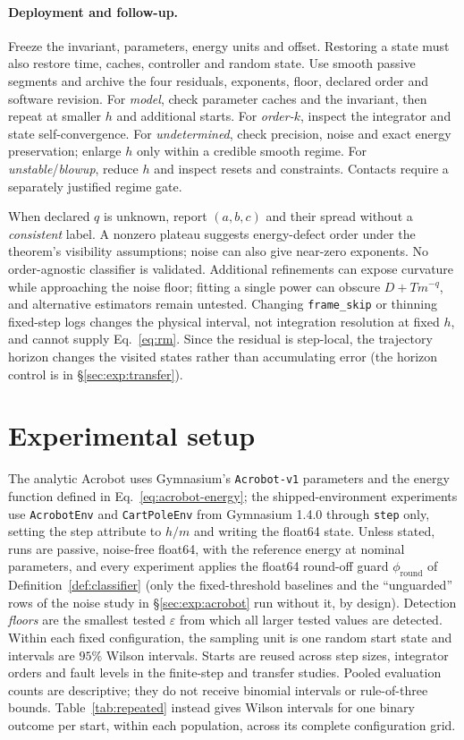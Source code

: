 \documentclass[10pt]{article}
\theoremstyle{definition}
\begin{document}
\paragraph{Deployment and follow-up.}\label{sec:deployment}
Freeze the invariant, parameters, energy units and offset. Restoring a state
must also restore time, caches, controller and random state. Use smooth passive
segments and archive the four residuals, exponents, floor, declared order and
software revision. For \emph{model}, check parameter caches and the invariant,
then repeat at smaller $h$ and additional starts. For \emph{order-$k$}, inspect
the integrator and state self-convergence. For \emph{undetermined}, check
precision, noise and exact energy preservation; enlarge $h$ only within a
credible smooth regime. For \emph{unstable}/\emph{blowup}, reduce $h$ and inspect
resets and constraints. Contacts require a separately justified regime gate.

When declared $q$ is unknown, report $(a,b,c)$ and their spread without a
\emph{consistent} label. A nonzero plateau suggests energy-defect order under
the theorem's visibility assumptions; noise can also give near-zero exponents.
No order-agnostic classifier is validated. Additional refinements can expose
curvature while approaching the noise floor; fitting a single power can
obscure $D+Tm^{-q}$, and alternative estimators remain untested. Changing
\texttt{frame\_skip} or thinning fixed-step logs changes the physical
interval, not integration resolution at fixed $h$, and cannot supply
Eq.~\eqref{eq:rm}. Since the residual is step-local, the trajectory horizon
changes the visited states rather than accumulating error (the horizon control
is in \S\ref{sec:exp:transfer}).

\section{Experimental setup}\label{sec:exp:setup}

The analytic Acrobot uses Gymnasium's \texttt{Acrobot-v1} parameters and
the energy function defined in Eq.~\eqref{eq:acrobot-energy}; the shipped-environment experiments use
\texttt{AcrobotEnv} and \texttt{CartPoleEnv} from Gymnasium 1.4.0
\citep{towers2024gymnasium} through \texttt{step} only, setting the step
attribute to $h/m$ and writing the float64 state. Unless stated, runs are
passive, noise-free float64, with the reference energy at nominal
parameters, and every experiment applies the float64 round-off guard
$\phi_{\mathrm{round}}$ of Definition~\ref{def:classifier} (only the
fixed-threshold baselines and the ``unguarded'' rows of the noise study in \S\ref{sec:exp:acrobot} run without it, by design).
Detection \emph{floors} are the smallest tested $\varepsilon$ from which all
larger tested values are detected. Within each fixed configuration, the
sampling unit is one random start state and intervals are $95\%$ Wilson
intervals. Starts are reused across step sizes, integrator orders and fault
levels in the finite-step and transfer studies. Pooled evaluation counts are
descriptive; they do not receive binomial intervals or rule-of-three bounds.
Table~\ref{tab:repeated} instead gives Wilson intervals for one binary outcome
per start, within each population, across its complete configuration grid.
\end{document}
